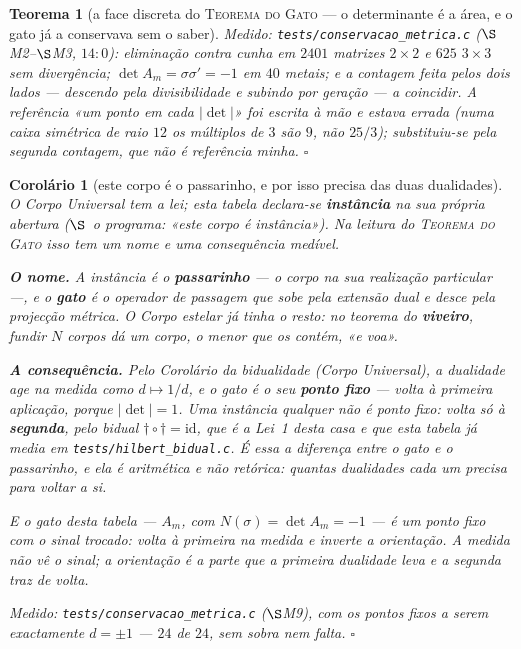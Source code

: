 \documentclass[11pt,a4paper]{article}
\newtheorem{teorema}{Teorema}
\newtheorem{corolario}{Corolário}
\newcommand{\code}[1]{\texttt{#1}}
\begin{document}
\begin{teorema}[a face discreta do \textsc{Teorema do Gato} --- o
determinante é a área, e o gato já a conservava sem o
saber]
\emph{Medido:} \code{tests/conservacao\_metrica.c} ($\S$M2--$\S$M3,
$14{:}0$): eliminação contra cunha em $2401$ matrizes $2\times2$ e $625$
$3\times3$ sem divergência; $\det A_{m}=\sigma\sigma'=-1$ em $40$
metais; e a contagem feita pelos \emph{dois} lados --- descendo pela
divisibilidade e subindo por geração --- a coincidir. A referência
«um ponto em cada $|\det|$» foi escrita à mão e estava errada (numa
caixa simétrica de raio $12$ os múltiplos de $3$ são $9$, não $25/3$);
substituiu-se pela segunda contagem, que não é referência minha.
$\square$
\end{teorema}

\begin{corolario}[este corpo é o passarinho, e por isso precisa das duas
dualidades]\label{cor:passarinho-peano}
O \emph{Corpo Universal} tem a lei; esta tabela declara-se
\textbf{instância} na sua própria abertura ($\S$~o programa: «este corpo é
instância»). Na leitura do \textsc{Teorema do Gato} isso tem um nome e
uma consequência medível.

\textbf{O nome.} A instância é o \textbf{passarinho} --- o corpo na sua
realização particular ---, e o \textbf{gato} é o operador de passagem que
sobe pela extensão dual e desce pela projecção métrica. O
\emph{Corpo estelar} já tinha o resto: no teorema do \textbf{viveiro},
fundir $N$ corpos dá \emph{um} corpo, o menor que os contém, «e voa».

\textbf{A consequência.} Pelo Corolário da bidualidade
(\emph{Corpo Universal}), a dualidade age na medida como $d\mapsto1/d$, e
o gato é o seu \textbf{ponto fixo} --- volta à primeira aplicação, porque
$|\det|=1$. Uma instância qualquer não é ponto fixo: volta só à
\textbf{segunda}, pelo bidual $\dagger\circ\dagger=\mathrm{id}$, que é a
Lei~1 desta casa e que esta tabela já media em
\code{tests/hilbert\_bidual.c}. É essa a diferença entre o gato e o
passarinho, e ela é aritmética e não retórica: \emph{quantas dualidades
cada um precisa para voltar a si}.

E o gato desta tabela --- $A_{m}$, com $N(\sigma)=\det A_{m}=-1$ --- é um
ponto fixo com o sinal trocado: volta à primeira na \emph{medida} e
inverte a \emph{orientação}. A medida não vê o sinal; a orientação é a
parte que a primeira dualidade leva e a segunda traz de volta.

\emph{Medido:} \code{tests/conservacao\_metrica.c} ($\S$M9), com os
pontos fixos a serem exactamente $d=\pm1$ --- $24$ de $24$, sem sobra nem
falta. $\square$
\end{corolario}
\end{document}
